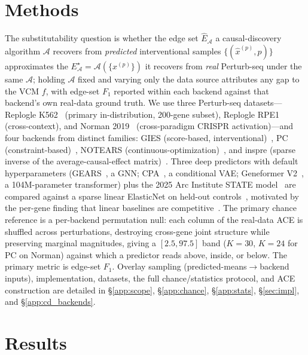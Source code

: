 \documentclass{article}
\theoremstyle{plain}
\theoremstyle{definition}
\theoremstyle{remark}
\begin{document}
\section{Methods}
\label{sec:methods}

The substitutability question is whether the edge set $\hat{E}_{\mathcal{A}}$ a causal-discovery algorithm $\mathcal{A}$ recovers from \emph{predicted} interventional samples $\{(\hat{x}^{(p)},p)\}$ approximates the $E^{\star}_{\mathcal{A}}=\mathcal{A}(\{x^{(p)}\})$ it recovers from \emph{real} Perturb-seq under the same $\mathcal{A}$; holding $\mathcal{A}$ fixed and varying only the data source attributes any gap to the VCM $f$, with edge-set $F_1$ reported within each backend against that backend's own real-data ground truth. We use three Perturb-seq datasets---Replogle K562~\citep{replogle2022} (primary in-distribution, 200-gene subset), Replogle RPE1~\citep{peidli2024scperturb} (cross-context), and Norman 2019~\citep{norman2019} (cross-paradigm CRISPR activation)---and four backends from distinct families: GIES (score-based, interventional)~\citep{hauser2012gies}, PC (constraint-based)~\citep{spirtes2000}, NOTEARS (continuous-optimization)~\citep{zheng2018notears}, and inspre (sparse inverse of the average-causal-effect matrix)~\citep{brown2025inspre}. Three deep predictors with default hyperparameters (GEARS~\citep{roohani2024gears}, a GNN; CPA~\citep{lotfollahi2023cpa}, a conditional VAE; Geneformer V2~\citep{theodoris2023geneformer}, a 104M-parameter transformer) plus the 2025 Arc Institute STATE model~\citep{adduri2025state,arc2025state} are compared against a sparse linear ElasticNet on held-out controls~\citep{zou2005elasticnet}, motivated by the per-gene finding that linear baselines are competitive~\citep{ahlmanneltze2025}. The primary chance reference is a per-backend permutation null: each column of the real-data ACE is shuffled across perturbations, destroying cross-gene joint structure while preserving marginal magnitudes, giving a $[2.5,97.5]$ band ($K{=}30$, $K{=}24$ for PC on Norman) against which a predictor reads above, inside, or below. The primary metric is edge-set $F_1$. Overlay sampling (predicted-means$\to$backend inputs), implementation, datasets, the full chance/statistics protocol, and ACE construction are detailed in \S\ref{app:scope}, \S\ref{app:chance}, \S\ref{app:stats}, \S\ref{sec:impl}, and \S\ref{app:cd_backends}.

\section{Results}
\label{sec:results}
\end{document}
